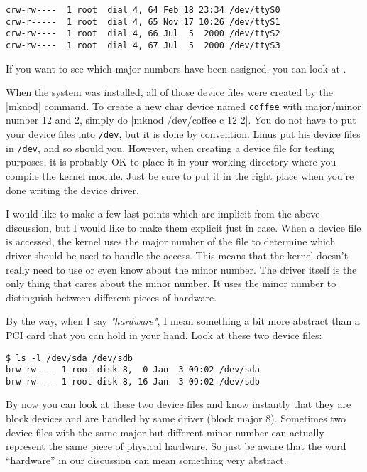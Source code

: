 \documentclass[10pt, oneside]{book}
\begin{document}
\begin{verbatim}
crw-rw----  1 root  dial 4, 64 Feb 18 23:34 /dev/ttyS0
crw-r-----  1 root  dial 4, 65 Nov 17 10:26 /dev/ttyS1
crw-rw----  1 root  dial 4, 66 Jul  5  2000 /dev/ttyS2
crw-rw----  1 root  dial 4, 67 Jul  5  2000 /dev/ttyS3
\end{verbatim}

If you want to see which major numbers have been assigned, you can look at .

When the system was installed, all of those device files were created by the \sh|mknod| command.
To create a new char device named \verb|coffee| with major/minor number 12 and 2, simply do \sh|mknod /dev/coffee c 12 2|.
You do not have to put your device files into \verb|/dev|, but it is done by convention.
Linus put his device files in \verb|/dev|, and so should you.
However, when creating a device file for testing purposes, it is probably OK to place it in your working directory where you compile the kernel module.
Just be sure to put it in the right place when you're done writing the device driver.

I would like to make a few last points which are implicit from the above discussion, but I would like to make them explicit just in case.
When a device file is accessed, the kernel uses the major number of the file to determine which driver should be used to handle the access.
This means that the kernel doesn't really need to use or even know about the minor number.
The driver itself is the only thing that cares about the minor number.
It uses the minor number to distinguish between different pieces of hardware.

By the way, when I say \emph{"hardware"}, I mean something a bit more abstract than a PCI card that you can hold in your hand.
Look at these two device files:

\begin{verbatim}
$ ls -l /dev/sda /dev/sdb
brw-rw---- 1 root disk 8,  0 Jan  3 09:02 /dev/sda
brw-rw---- 1 root disk 8, 16 Jan  3 09:02 /dev/sdb
\end{verbatim}

By now you can look at these two device files and know instantly that they are block devices and are handled by same driver (block major 8).
Sometimes two device files with the same major but different minor number can actually represent the same piece of physical hardware.
So just be aware that the word ``hardware'' in our discussion can mean something very abstract.
\end{document}
